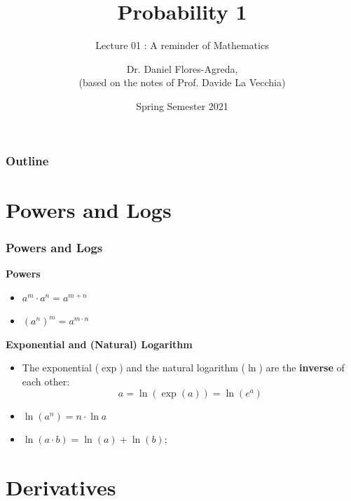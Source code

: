 \documentclass[notes=show]{beamer}\usepackage[]{graphicx}\usepackage[]{color}
\begin{document}
\title[S110015]{Probability 1}
\subtitle{Lecture 01 : A reminder of Mathematics}
\author[Flores-Agreda, La Vecchia]{Dr. Daniel Flores-Agreda, \\[0.5em] \tiny{(based on the notes of Prof. Davide La Vecchia)}}
\date{Spring Semester 2021}

\begin{frame}
\titlepage
\end{frame}

\begin{frame}
\frametitle{Outline}
\tableofcontents
\end{frame}

\section{Powers and Logs}

\begin{frame}
\frametitle{Powers and Logs}


\textbf{Powers}

\vspace{0.2cm}

\begin{itemize}
\item $a^m \cdot a^n = a^{m+n}$
\item $(a^n)^m = a^{m \cdot n}$
\end{itemize}

\pause

\vspace{0.2cm}

\textbf{Exponential and (Natural) Logarithm}

\vspace{0.2cm}

\begin{itemize}
\item The exponential ($\exp$) and the natural logarithm ($\ln$) are the \textbf{inverse} of each other: $$a= \ln(\exp (a) ) = \ln(e^a)$$
\pause
\item $\ln(a^n) = n \cdot \ln a$
\item $\ln (a \cdot b) = \ln (a) + \ln (b)$;
\end{itemize}

\end{frame}



\section{Derivatives}
\end{document}
